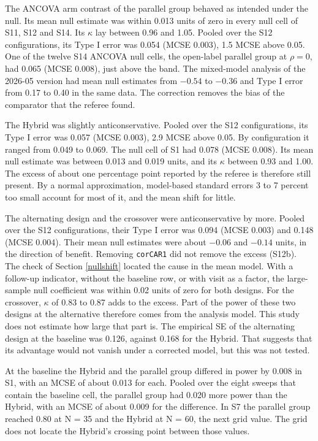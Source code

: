 \documentclass[
  11pt,
]{article}
\begin{document}
The ANCOVA arm contrast of the parallel group behaved as intended under the null. Its mean null estimate was within 0.013 units of zero in every null cell of S11, S12 and S14. Its \(\kappa\) lay between 0.96 and 1.05. Pooled over the S12 configurations, its Type I error was 0.054 (MCSE 0.003), 1.5 MCSE above 0.05. One of the twelve S14 ANCOVA null cells, the open-label parallel group at \(\rho = 0\), had 0.065 (MCSE 0.008), just above the band. The mixed-model analysis of the 2026-05 version had mean null estimates from \(-0.54\) to \(-0.36\) and Type I error from 0.17 to 0.40 in the same data. The correction removes the bias of the comparator that the referee found.

The Hybrid was slightly anticonservative. Pooled over the S12 configurations, its Type I error was 0.057 (MCSE 0.003), 2.9 MCSE above 0.05. By configuration it ranged from 0.049 to 0.069. The null cell of S1 had 0.078 (MCSE 0.008). Its mean null estimate was between 0.013 and 0.019 units, and its \(\kappa\) between 0.93 and 1.00. The excess of about one percentage point reported by the referee is therefore still present. By a normal approximation, model-based standard errors 3 to 7 percent too small account for most of it, and the mean shift for little.

The alternating design and the crossover were anticonservative by more. Pooled over the S12 configurations, their Type I error was 0.094 (MCSE 0.003) and 0.148 (MCSE 0.004). Their mean null estimates were about \(-0.06\) and \(-0.14\) units, in the direction of benefit. Removing \texttt{corCAR1} did not remove the excess (S12b). The check of Section \ref{nullshift} located the cause in the mean model. With a follow-up indicator, without the baseline row, or with visit as a factor, the large-sample null coefficient was within 0.02 units of zero for both designs. For the crossover, \(\kappa\) of 0.83 to 0.87 adds to the excess. Part of the power of these two designs at the alternative therefore comes from the analysis model. This study does not estimate how large that part is. The empirical SE of the alternating design at the baseline was 0.126, against 0.168 for the Hybrid. That suggests that its advantage would not vanish under a corrected model, but this was not tested.

At the baseline the Hybrid and the parallel group differed in power by 0.008 in S1, with an MCSE of about 0.013 for each. Pooled over the eight sweeps that contain the baseline cell, the parallel group had 0.020 more power than the Hybrid, with an MCSE of about 0.009 for the difference. In S7 the parallel group reached 0.80 at N = 35 and the Hybrid at N = 60, the next grid value. The grid does not locate the Hybrid's crossing point between those values.
\end{document}
